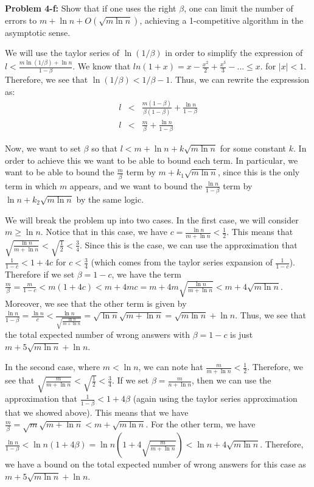 \documentclass[psamsfonts]{amsart}
\newenvironment{sol}{\vspace{0.25cm}{\large \bfseries Solution:}}{\qedsymbol}
\newenvironment{prob}[1]{\begin{framed}{\large \bfseries Problem #1:}}{\end{framed}}
\begin{document}
\begin{prob}{4-f}
Show that if one uses the right $\beta$, one can limit the number of errors to $m + \ln n + O( \sqrt{m \ln n})$, achieving a 1-competitive algorithm in the asymptotic sense.
\end{prob}
\begin{sol}
We will use the taylor series of $\ln(1/\beta)$ in order to simplify the expression of $l < \frac{m \ln(1/\beta) + \ln n}{ 1 - \beta}$. We know that $ln(1 + x) = x - \frac{x^2}{2} + \frac{x^3}{3} - \ldots \leq x$. for $|x| < 1$. Therefore, we see that $\ln(1/\beta) < 1/\beta - 1$. Thus, we can rewrite the expression as:
\begin{eqnarray}
l &<& \frac{m (1 - \beta)}{\beta(1 - \beta)} + \frac{\ln n}{1 - \beta} \\
l &<& \frac{m}{\beta} + \frac{\ln n}{1 - \beta}
\end{eqnarray}

Now, we want to set $\beta$ so that $l < m + \ln n + k \sqrt{m \ln n}$ for some constant $k$. In order to achieve this we want to be able to bound each term. In particular, we want to be able to bound the $\frac{m}{\beta}$ term by $m + k_1 \sqrt{m \ln n}$, since this is the only term in which $m$ appears, and we want to bound the $\frac{\ln n}{1 - \beta}$ term by $\ln n + k_2 \sqrt{m \ln n}$ by the same logic.

We will break the problem up into two cases. In the first case, we will consider $m \geq \ln n$. Notice that in this case, we have $c = \frac{\ln n}{m + \ln n} < \frac{1}{2}$. This means that $\sqrt{\frac{\ln n}{m + \ln n}} < \sqrt{\frac{1}{2}} < \frac{3}{4}$. Since this is the case, we can use the approximation that $\frac{1}{1 - c} < 1 + 4c$ for $c < \frac{3}{4}$ (which comes from the taylor series expansion of $\frac{1}{1-c}$). Therefore if we set $\beta = 1 - c$, we have the term $\frac{m}{\beta} = \frac{m}{1 - c} < m ( 1 + 4c) < m + 4mc = m + 4m \sqrt{\frac{\ln n}{m + \ln n}} < m + 4 \sqrt{m \ln n}$. Moreover, we see that the other term is given by $\frac{\ln n}{1 - \beta} = \frac{\ln n}{c} < \frac{\ln n}{ \sqrt{ \frac{\ln n}{m + \ln n}}} = \sqrt{ \ln n} \sqrt{ m + \ln n} = \sqrt{m \ln n} + \ln n$. Thus, we see that the total expected number of wrong answers with $\beta = 1 - c$ is just $m + 5 \sqrt{m \ln n} + \ln n$. 

In the second case, where $m < \ln n$, we can note hat $\frac{m}{m + \ln n} < \frac{1}{2}$. Therefore, we see that $\sqrt{\frac{m}{m + \ln n}} < \sqrt{\frac{1}{2}} < \frac{3}{4}$. If we set $\beta = \frac{m}{n + \ln n}$, then we can use the approximation that $\frac{1}{1 - \beta} < 1 + 4 \beta$ (again using the taylor series approximation that we showed above). This means that we have $\frac{m}{\beta} = \sqrt{m} \sqrt{m + \ln n} < m + \sqrt{m \ln n}$. For the other term, we have $\frac{\ln n}{1 - \beta} < \ln n ( 1 + 4 \beta) = \ln n \left( 1 + 4 \sqrt{\frac{m}{m + \ln n}} \right) < \ln n + 4 \sqrt{m \ln n}$. Therefore, we have a bound on the total expected number of wrong answers for this case as $m + 5 \sqrt{ m \ln n} + \ln n$. 


\end{sol}
\end{document}
